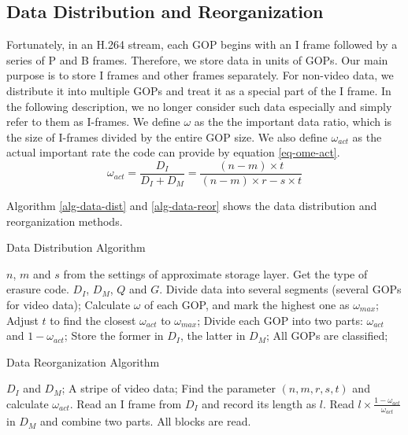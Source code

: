 \documentclass[sigconf]{acmart}
\begin{document}
\subsection{Data Distribution and Reorganization}
Fortunately, in an H.264 stream, each GOP begins with an I frame followed by a series of P and B frames. Therefore, we store data in units of GOPs. Our main purpose is to store I frames and other frames separately. For non-video data, we distribute it into multiple GOPs and treat it as a special part of the I frame. In the following description, we no longer consider such data especially and simply refer to them as I-frames.
We define $\omega$ as the the important data ratio, which is the size of I-frames divided by the entire GOP size. We also define $\omega_{act}$ as the actual important rate the code can provide by equation \ref{eq-ome-act}.
\begin{equation}\label{eq-ome-act}
    \omega_{act}=\frac{D_I}{D_I+D_M}=\frac{(n-m) \times t}{(n-m) \times r-s \times t}
\end{equation}

  Algorithm \ref{alg-data-dist} and \ref{alg-data-reor} shows the data distribution and reorganization methods.

\begin{algorithm}[htb] 
\caption{Data Distribution Algorithm} 
\label{alg-data-dist} 
\begin{algorithmic}[1] 

\Require  $n$, $m$ and $s$ from the settings of approximate storage layer. Get the type of erasure code.
\Ensure $D_I$, $D_M$, $Q$ and $G$.
\State Divide data into several segments (several GOPs for video data);
\State Calculate $\omega$ of each GOP, and mark the highest one as $\omega_{max}$;
\State Adjust $t$ to find the closest $\omega_{act}$ to $\omega_{max}$;
\Repeat 
\State Divide each GOP into two parts: $\omega_{act}$ and $1-\omega_{act}$;
\State Store the former in $D_I$, the latter in $D_M$;
\Until All GOPs are classified;
\EndWhile

\end{algorithmic} 
\end{algorithm}


\begin{algorithm}[htb] 
\caption{Data Reorganization Algorithm} 
\label{alg-data-reor} 
\begin{algorithmic}[1] 
\Require $D_I$ and $D_M$;
\Ensure A stripe of video data;
\State Find the parameter $(n,m,r,s,t)$ and calculate $\omega_{act}$.
\Repeat
\State Read an I frame from $D_I$ and record its length as $l$.
\State Read $l \times \frac{1-\omega_{act}}{\omega_{act}}$ in $D_M$ and combine two parts.
\Until All blocks are read.
\end{algorithmic} 
\end{algorithm}
\end{document}
